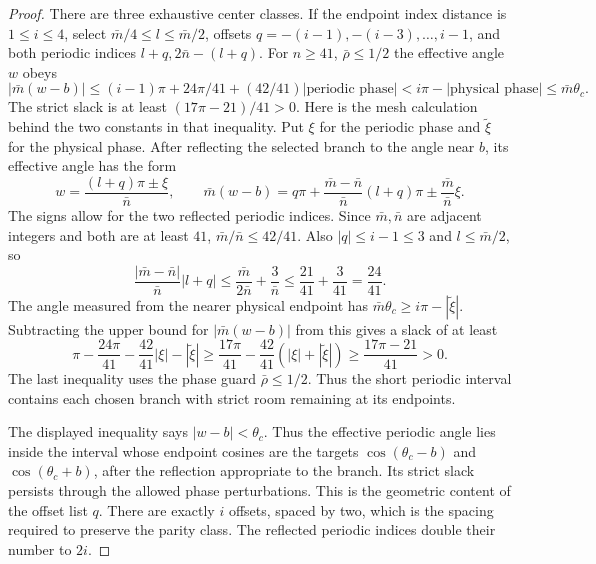 \begin{proof}
There are three exhaustive center classes.  If the endpoint index
distance is $1\leq i\leq4$, select $\bar{m}/4\leq l\leq \bar{m}/2$, offsets
$q=-(i-1),-(i-3),\ldots,i-1$, and both periodic indices
$l+q,2\bar{n}-(l+q)$.  For $n\geq41$, $\bar{\rho}\leq1/2$ the effective angle $w$ obeys
\[
 |\bar{m}(w-b)|\leq(i-1)\pi+24\pi/41+(42/41)|\text{periodic phase}|
       <i\pi-|\text{physical phase}|\leq \bar{m}\theta_c.
\]
The strict slack is at least $(17\pi-21)/41>0$.
Here is the mesh calculation behind the two constants in that
inequality.  Put $\xi$ for the periodic phase and $\widetilde\xi$ for
the physical phase.  After reflecting the selected branch to the
angle near $b$, its effective angle has the form
\[
 w=\frac{(l+q)\pi\pm\xi}{\bar{n}},\qquad
 \bar{m}(w-b)=q\pi+\frac{\bar{m}-\bar{n}}{\bar{n}}(l+q)\pi
                      \pm\frac {\bar{m}}{\bar{n}}\xi.
\]
The signs allow for the two reflected periodic indices.  Since
$\bar{m},\bar{n}$ are adjacent integers and both are at least $41$,
$\bar{m}/\bar{n}\leq42/41$.  Also $|q|\leq i-1\leq3$ and
$l\leq \bar{m}/2$, so
\[
 \frac{|\bar{m}-\bar{n}|}{\bar{n}}|l+q|
 \leq\frac{\bar{m}}{2\bar{n}}+\frac{3}{\bar{n}}
 \leq\frac{21}{41}+\frac3{41}=\frac{24}{41}.
\]
The angle measured from the nearer physical endpoint has
$\bar{m}\theta_c\geq i\pi-|\widetilde\xi|$.  Subtracting the upper bound for
$|\bar{m}(w-b)|$ from this gives a slack of at least
\[
 \pi-\frac{24\pi}{41}-\frac{42}{41}|\xi|-|\widetilde\xi|
 \geq\frac{17\pi}{41}
              -\frac{42}{41}(|\xi|+|\widetilde\xi|)
 \geq\frac{17\pi-21}{41}>0.
\]
The last inequality uses the phase guard $\bar{\rho}\leq1/2$.  Thus the
short periodic interval contains each chosen branch with strict
room remaining at its endpoints.

The displayed inequality says $|w-b|<\theta_c$.  Thus the effective
periodic angle lies inside the interval whose endpoint cosines are
the targets $\cos(\theta_c-b)$ and $\cos(\theta_c+b)$, after the
reflection appropriate to the branch.  Its strict slack persists
through the allowed phase perturbations.  This is the geometric
content of the offset list $q$.  There are exactly $i$ offsets,
spaced by two, which is the spacing required to preserve the parity
class.  The reflected periodic indices double their number to $2i$.


\end{proof}
